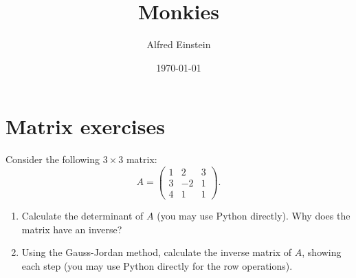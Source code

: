 \documentclass[11pt]{article}
\title{Monkies}
\author{Alfred Einstein}
\affil{School of Hard Knocks}
\date{\today}
\begin{document}
\maketitle

\section{Matrix exercises}



\begin{math-block}
    Consider the following $3\times 3$ matrix:
    \[
        A = \begin{pmatrix}
            1 & 2 & 3 \\
            3 &-2 & 1 \\
            4 & 1 & 1
        \end{pmatrix}.
    \]
    \begin{enumerate}[leftmargin=*,label=\textit{\alph*})]
        \item
            Calculate the determinant of $A$ (you may use Python directly). Why does the matrix have an inverse?
        \item
            Using the Gauss-Jordan method, calculate the inverse matrix of $A$, showing each step (you may use Python directly for the row operations).
    \end{enumerate}
\end{math-block}
\end{document}
